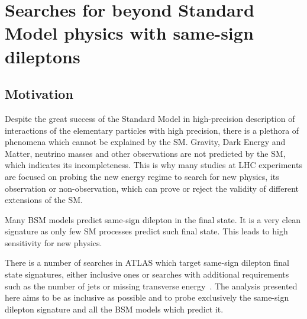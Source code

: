 \chapter{Searches for beyond Standard Model physics with same-sign dileptons}
\label{chap:SS}
\section{Motivation}

Despite the great success of the Standard Model in high-precision description of interactions of the elementary particles with high precision, there is a plethora of phenomena
which cannot be explained by the SM. Gravity, Dark Energy and Matter, neutrino masses and other observations are not predicted by the
SM, which indicates its incompleteness.
This is why many studies at LHC experiments are focused on probing the new energy regime to search for new physics, 
its observation or non-observation, which can prove or reject the validity of different extensions of the SM.

Many BSM models predict same-sign dilepton in the final state.
It is a very clean signature as only few SM processes predict such final state.
This leads to high sensitivity for new physics.

There is a number of searches in ATLAS which target same-sign dilepton final state
signatures, either inclusive ones or searches with additional requirements such as the number of jets or missing transverse energy~\cite{heavy_majorana_neutrino_paper,floderus_paper,Aad:2014pda}.
The analysis presented here aims to be as inclusive as possible and to probe exclusively the same-sign dilepton signature and all the BSM models which predict it.


